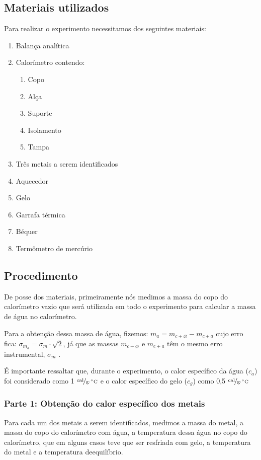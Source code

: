 \documentclass[a4paper]{article}
\begin{document}
	\subsection{Materiais utilizados}
		Para realizar o experimento necessitamos dos seguintes materiais:
		
		\begin{enumerate}
			\item Balança analítica 
			\item Calorímetro contendo:
				\begin{enumerate}
					\item Copo 
					\item Alça 
					\item Suporte 
					\item Isolamento 
					\item Tampa
				\end{enumerate}
			\item Três metais a serem identificados 
			\item Aquecedor 
			\item Gelo 
			\item Garrafa térmica 
			\item Béquer 
			\item Termômetro de mercúrio 
		\end{enumerate}
		
	\subsection{Procedimento}

		De posse dos materiais, primeiramente nós medimos a massa do copo do calorímetro vazio que será utilizada em todo o experimento para calcular a massa de água no calorímetro.			
		
		Para a obtenção dessa massa de água, fizemos: $m_{a}=m_{c+\varnothing}-m_{c+a}$	cujo erro fica: $\sigma_{m_{a}}=\sigma_{m}\cdot\sqrt{2}$, já que as massas $m_{c+\varnothing}$ e $m_{c+a}$ têm o mesmo erro instrumental, $\sigma_{m}$ .
		
		É importante ressaltar que, durante o experimento, o calor específico da água ($c_a$) foi considerado como 1 $\unitfrac{cal}{g \cdot ^{\circ}C}$ e o calor específico do gelo ($c_g$) como 0,5 $\unitfrac{cal}{g \cdot ^{\circ}C}$

		\subsubsection{Parte 1: Obtenção do calor específico dos metais}
			Para cada um dos metais a serem identificados, medimos a massa do metal, a massa do copo do calorímetro com água, a temperatura dessa água no copo do calorímetro, que em alguns casos teve que ser resfriada com gelo, a temperatura do metal e a temperatura deequilíbrio.
			
\end{document}
